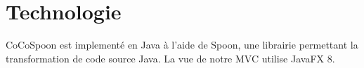 \section{Technologie}

CoCoSpoon est implementé en Java à l'aide de Spoon, une librairie permettant la transformation de code source Java. La vue de notre MVC utilise JavaFX 8. 